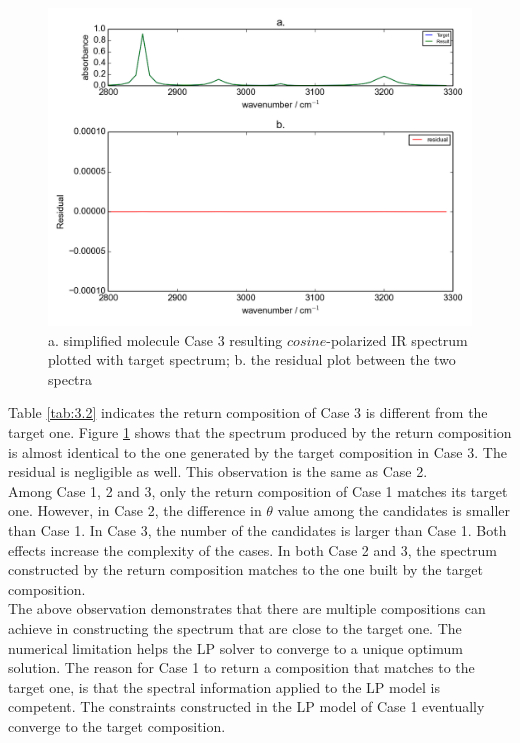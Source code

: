 \begin{figure}[!ht] 
\centering
\includegraphics[scale=0.7]{Figures/toy_model_result_plotting_ir_cos_10candi_1.png} 
\caption{a. simplified molecule Case 3 resulting $cosine$-polarized IR spectrum plotted with target spectrum; b. the residual plot between the two spectra}
\label{fig:3.3}
\end{figure}

Table \ref{tab:3.2} indicates the return composition of Case 3 is different from the target one. Figure \ref{fig:3.3} shows that the spectrum produced by the return composition is almost identical to the one generated by the target composition in Case 3. The residual is negligible as well. This observation is the same as Case 2. \\

Among Case 1, 2 and 3, only the return composition of Case 1 matches its target one. However, in Case 2, the difference in $\theta$ value among the candidates is smaller than Case 1. In Case 3, the number of the candidates is larger than Case 1. Both effects increase the complexity of the cases. In both Case 2 and 3, the spectrum constructed by the return composition matches to the one built by the target composition. \\

The above observation demonstrates that there are multiple compositions can achieve in constructing the spectrum that are close to the target one. The numerical limitation helps the LP solver to converge to a unique optimum solution. The reason for Case 1 to return a composition that matches to the target one, is that the spectral information applied to the LP model is competent. The constraints constructed in the LP model of Case 1 eventually converge to the target composition. \\ 

